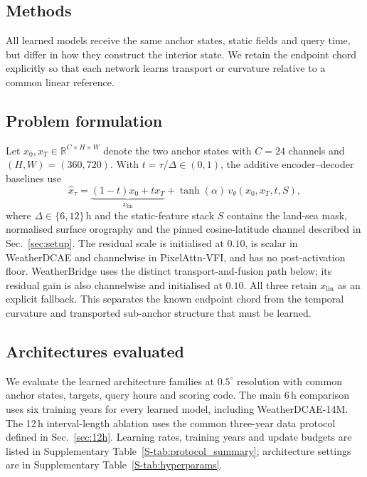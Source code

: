 \documentclass[referee,lineno,pdflatex,sn-nature]{sn-jnl}
\begin{document}
\begin{deferredmethodsintro}
\section{Methods}
\label{sec:method}

All learned models receive the same anchor states, static fields and query
time, but differ in how they construct the interior state. We retain the
endpoint chord explicitly so that each network learns transport or curvature
relative to a common linear reference.

\subsection{Problem formulation}

Let $x_0, x_T \in \mathbb{R}^{C \times H \times W}$ denote the two
anchor states with $C{=}24$ channels and $(H, W){=}(360, 720)$. With
$t=\tau/\Delta\in(0,1)$, the additive encoder--decoder baselines use
\begin{equation}
\hat{x}_\tau =
\underbrace{(1-t)x_0+t x_T}_{x_{\mathrm{lin}}}
+\tanh(\alpha)\,v_\theta(x_0,x_T,t,S),
\label{eq:scaffold}
\end{equation}
where $\Delta \in \{6, 12\}\,$h and the static-feature stack $S$ contains the
land-sea mask, normalised surface orography and the pinned cosine-latitude
channel described in Sec.~\ref{sec:setup}. The residual scale is initialised at
$0.10$, is scalar in WeatherDCAE and channelwise in PixelAttn-VFI, and has no
post-activation floor. WeatherBridge uses the distinct transport-and-fusion
path below; its residual gain is also channelwise and initialised at $0.10$.
All three retain $x_{\mathrm{lin}}$ as an explicit fallback.
This separates the known endpoint chord from the temporal curvature and
transported sub-anchor structure that must be learned.

\subsection{Architectures evaluated}

We evaluate the learned architecture families at $0.5^\circ$ resolution
with common anchor states, targets, query hours and scoring code. The main
6\,h comparison uses six training years for every learned model, including
WeatherDCAE-14M. The 12\,h interval-length ablation uses the
common three-year data protocol defined in Sec.~\ref{sec:12h}.
Learning rates, training years and update budgets are listed in
Supplementary Table~\ref{S-tab:protocol_summary}; architecture settings are
in Supplementary Table~\ref{S-tab:hyperparams}.


\end{deferredmethodsintro}
\end{document}
